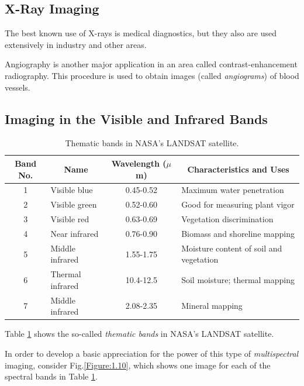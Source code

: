\documentclass[12pt,a4paper,twoside,openany]{book}
\begin{document}
\subsection{X-Ray Imaging}

The best known use of X-rays is medical diagnostics, but they also are used extensively in industry and other areas.

Angiography is another major application in an area called contrast-enhancement radiography. This procedure is used to obtain images (called \textit{angiograms}) of blood vessels.

\subsection{Imaging in the Visible and Infrared Bands}

\begin{table}[htbp]
    \centering
    \begin{tabular}{|clcl|}
        \hline
        \textbf{Band No.}&\multicolumn{1}{c}{\textbf{Name}}&\textbf{Wavelength ($\mu$m)}&\multicolumn{1}{c}{\textbf{Characteristics and Uses}}\vline\\ \hline
        1&Visible blue&0.45-0.52&Maximum water penetration\\
        2&Visible green&0.52-0.60&Good for measuring plant vigor\\
        3&Visible red&0.63-0.69&Vegetation discrimination\\
        4&Near infrared&0.76-0.90&Biomass and shoreline mapping\\
        5&Middle infrared&1.55-1.75&Moisture content of soil and vegetation\\
        6&Thermal infrared&10.4-12.5&Soil moisture; thermal mapping\\
        7&Middle infrared&2.08-2.35&Mineral mapping\\
        \hline
    \end{tabular}
    \caption{Thematic bands in NASA's LANDSAT satellite.}
    \label{Table:1.1}
\end{table}

Table \ref{Table:1.1} shows the so-called \textit{thematic bands} in NASA's LANDSAT satellite.

In order to develop a basic appreciation for the power of this type of \textit{multispectral} imaging, consider Fig.\;\ref{Figure:1.10}, which shows one image for each of the spectral bands in Table \ref{Table:1.1}.
\end{document}
